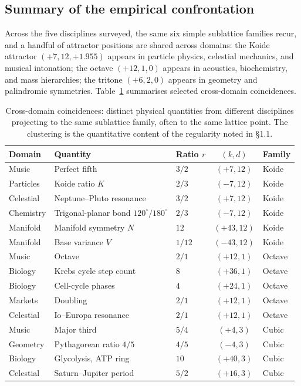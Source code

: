 \documentclass[11pt,a4paper]{article}
\theoremstyle{definition}
\theoremstyle{remark}
\begin{document}
\subsection{Summary of the empirical confrontation}

Across the five disciplines surveyed, the same six simple sublattice families recur, and a handful of attractor positions are shared across domains: the Koide attractor $(+7,12,+1.955)$ appears in particle physics, celestial mechanics, and musical intonation; the octave $(+12,1,0)$ appears in acoustics, biochemistry, and mass hierarchies; the tritone $(+6,2,0)$ appears in geometry and palindromic symmetries. Table~\ref{tab:cross} summarises selected cross-domain coincidences.

\begin{table}[h]
\centering
\small
\begin{tabular}{@{}l l l c l@{}}
\toprule
Domain & Quantity & Ratio $r$ & $(k,d)$ & Family\\
\midrule
Music & Perfect fifth & $3/2$ & $(+7, 12)$ & Koide\\
Particles & Koide ratio $K$ & $2/3$ & $(-7, 12)$ & Koide\\
Celestial & Neptune--Pluto resonance & $3/2$ & $(+7, 12)$ & Koide\\
Chemistry & Trigonal-planar bond $120^{\circ}/180^{\circ}$ & $2/3$ & $(-7, 12)$ & Koide\\
Manifold & Manifold symmetry $N$ & $12$ & $(+43, 12)$ & Koide\\
Manifold & Base variance $V$ & $1/12$ & $(-43, 12)$ & Koide\\
\addlinespace
Music & Octave & $2/1$ & $(+12, 1)$ & Octave\\
Biology & Krebs cycle step count & $8$ & $(+36, 1)$ & Octave\\
Biology & Cell-cycle phases & $4$ & $(+24, 1)$ & Octave\\
Markets & Doubling & $2/1$ & $(+12, 1)$ & Octave\\
Celestial & Io--Europa resonance & $2/1$ & $(+12, 1)$ & Octave\\
\addlinespace
Music & Major third & $5/4$ & $(+4, 3)$ & Cubic\\
Geometry & Pythagorean ratio $4/5$ & $4/5$ & $(-4, 3)$ & Cubic\\
Biology & Glycolysis, ATP ring & $10$ & $(+40, 3)$ & Cubic\\
Celestial & Saturn--Jupiter period & $5/2$ & $(+16, 3)$ & Cubic\\
\bottomrule
\end{tabular}
\caption{Cross-domain coincidences: distinct physical quantities from different disciplines projecting to the same sublattice family, often to the same lattice point. The clustering is the quantitative content of the regularity noted in \S1.1.}
\label{tab:cross}
\end{table}
\end{document}

